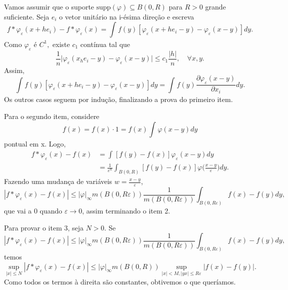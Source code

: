 \documentclass[MeasureTheory/measure_theory.tex]{subfiles}
\begin{document}
\begin{proof*}
	Vamos assumir que o suporte \(\mathrm{supp}(\varphi )\subseteq B(0, R)\) para \(R>0\) grande suficiente. Seja \(e_{i}\) o vetor unitário na i-ésima direção e escreva
	\[
		f*\varphi_{\varepsilon }(x+he_{i}) - f*\varphi_{\varepsilon }(x) = \int_{}^{}f(y)[\varphi_{\varepsilon }(x+he_{i}-y) - \varphi_{\varepsilon }(x-y)]dy.
	\]
	Como \(\varphi_{\varepsilon }\) é \(C^{1},\) existe \(c_{1}\) contínua tal que
	\[
		\frac{1}{n}\biggl\vert \varphi _{\varepsilon }(x_he_{i}-y) - \varphi _{\varepsilon }(x-y) \biggr\vert\leq c_1\frac{|h|}{n},\quad \forall x, y.
	\]
	Assim,
	\[
		\int_{}^{}f(y)[\varphi_{\varepsilon }(x+he_{i}-y) - \varphi_{\varepsilon }(x-y)]dy = \int_{}^{}f(y)\frac{\partial \varphi_{\varepsilon }(x-y)}{\partial x_{i}}dy.
	\]
	Os outros casos seguem por indução, finalizando a prova do primeiro item.

	Para o segundo item, considere
	\[
		f(x) = f(x)\cdot 1=f(x)\int_{}^{}\varphi (x-y)dy
	\]
	pontual em x. Logo,
	\begin{align*}
		f*\varphi_{\varepsilon }(x) - f(x) & = \int_{}^{}[f(y)-f(x)]\varphi_\varepsilon  (x-y)dy                                                       \\
		                                   & = \frac{1}{\varepsilon ^{n}}\int_{B(0, R)}^{}[f(y)-f(x)]\varphi \biggl(\frac{x-y}{\varepsilon }\biggr)dy.
	\end{align*}
	Fazendo uma mudança de variáveis \(w=\frac{x-y}{\varepsilon }\),
	\[
		|f*\varphi _{\varepsilon }(x)-f(x)|\leq |\varphi |_{\infty}m(B(0, R\varepsilon ))\frac{1}{m(B(0, R\varepsilon ))}\int_{B(0, R\varepsilon )}^{}f(x)-f(y)dy,
	\]
	que vai a 0 quando \(\varepsilon \to 0\), assim terminando o item 2.

	Para provar o item 3, seja \(N > 0\). Se
	\[
		|f*\varphi _{\varepsilon }(x)-f(x)|\leq |\varphi |_{\infty}m(B(0, R\varepsilon ))\frac{1}{m(B(0, R\varepsilon ))}\int_{B(0, R\varepsilon )}^{}f(x)-f(y)dy,
	\]
	temos
	\[
		\sup_{|x|\leq N}|f*\varphi_{\varepsilon }(x) - f(x)|\leq |\varphi |_{\infty}m(B(0, R))\sup_{|x|<M, |yx|\leq R\varepsilon }|f(x)-f(y)|.
	\]
	Como todos os termos à direita são constantes, obtivemos o que queríamos.


\end{proof*}
\end{document}
